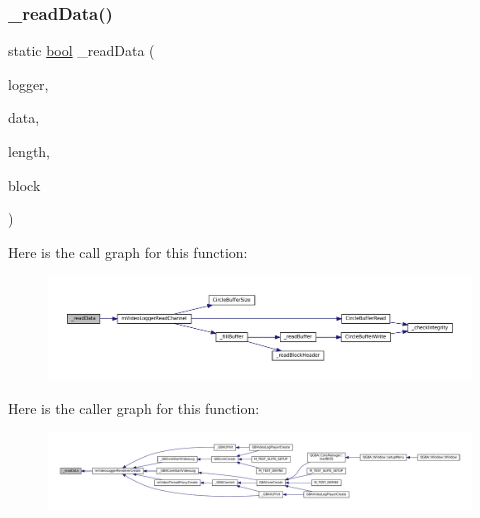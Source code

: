 \subsubsection{\texorpdfstring{\+\_\+read\+Data()}{\_readData()}}
{\footnotesize\ttfamily static \mbox{\hyperlink{libretro_8h_a4a26dcae73fb7e1528214a068aca317e}{bool}} \+\_\+read\+Data (\begin{DoxyParamCaption}\item[{struct m\+Video\+Logger $\ast$}]{logger,  }\item[{void $\ast$}]{data,  }\item[{size\+\_\+t}]{length,  }\item[{\mbox{\hyperlink{libretro_8h_a4a26dcae73fb7e1528214a068aca317e}{bool}}}]{block }\end{DoxyParamCaption})\hspace{0.3cm}{\ttfamily [static]}}

Here is the call graph for this function\+:
\nopagebreak
\begin{figure}[H]
\begin{center}
\leavevmode
\includegraphics[width=350pt]{video-logger_8c_abcbab73349348e3342c1e7255ed55ee4_cgraph}
\end{center}
\end{figure}
Here is the caller graph for this function\+:
\nopagebreak
\begin{figure}[H]
\begin{center}
\leavevmode
\includegraphics[width=350pt]{video-logger_8c_abcbab73349348e3342c1e7255ed55ee4_icgraph}
\end{center}
\end{figure}
\mbox{\label{video-logger_8c_ac5911963671b26f1d64938bcf9ac6648}} 
